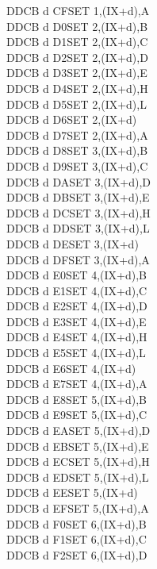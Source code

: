 \begin{multicols}{3}
{\begin{tabbing}
	DDCB d CF\>SET 1,(IX+d),A\UNDOC\\
	DDCB d D0\>SET 2,(IX+d),B\UNDOC\\
	DDCB d D1\>SET 2,(IX+d),C\UNDOC\\
	DDCB d D2\>SET 2,(IX+d),D\UNDOC\\
	DDCB d D3\>SET 2,(IX+d),E\UNDOC\\
	DDCB d D4\>SET 2,(IX+d),H\UNDOC\\
	DDCB d D5\>SET 2,(IX+d),L\UNDOC\\
	DDCB d D6\>SET 2,(IX+d)\\
	DDCB d D7\>SET 2,(IX+d),A\UNDOC\\
	DDCB d D8\>SET 3,(IX+d),B\UNDOC\\
	DDCB d D9\>SET 3,(IX+d),C\UNDOC\\
	DDCB d DA\>SET 3,(IX+d),D\UNDOC\\
	DDCB d DB\>SET 3,(IX+d),E\UNDOC\\
	DDCB d DC\>SET 3,(IX+d),H\UNDOC\\
	DDCB d DD\>SET 3,(IX+d),L\UNDOC\\
	DDCB d DE\>SET 3,(IX+d)\\
	DDCB d DF\>SET 3,(IX+d),A\UNDOC\\
	DDCB d E0\>SET 4,(IX+d),B\UNDOC\\
	DDCB d E1\>SET 4,(IX+d),C\UNDOC\\
	DDCB d E2\>SET 4,(IX+d),D\UNDOC\\
	DDCB d E3\>SET 4,(IX+d),E\UNDOC\\
	DDCB d E4\>SET 4,(IX+d),H\UNDOC\\
	DDCB d E5\>SET 4,(IX+d),L\UNDOC\\
	DDCB d E6\>SET 4,(IX+d)\\
	DDCB d E7\>SET 4,(IX+d),A\UNDOC\\
	DDCB d E8\>SET 5,(IX+d),B\UNDOC\\
	DDCB d E9\>SET 5,(IX+d),C\UNDOC\\
	DDCB d EA\>SET 5,(IX+d),D\UNDOC\\
	DDCB d EB\>SET 5,(IX+d),E\UNDOC\\
	DDCB d EC\>SET 5,(IX+d),H\UNDOC\\
	DDCB d ED\>SET 5,(IX+d),L\UNDOC\\
	DDCB d EE\>SET 5,(IX+d)\\
	DDCB d EF\>SET 5,(IX+d),A\UNDOC\\
	DDCB d F0\>SET 6,(IX+d),B\UNDOC\\
	DDCB d F1\>SET 6,(IX+d),C\UNDOC\\
	DDCB d F2\>SET 6,(IX+d),D\UNDOC\\

\end{tabbing}}
\end{multicols}
